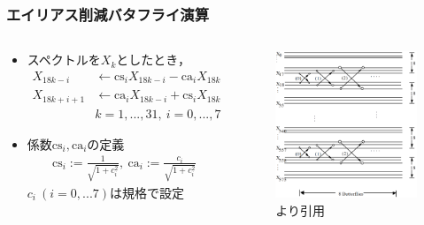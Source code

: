\documentclass[14pt,xcolor=dvipsnames,table,dvipdfmx]{beamer}
\begin{document}
\begin{frame}[c]
    \frametitle{エイリアス削減バタフライ演算}
    \begin{columns}
        \begin{column}{0.55\textwidth}
            \small
            \begin{itemize}
                \item スペクトルを$X_{k}$としたとき，
                    \begin{align}
                        X_{18k - i} &\leftarrow \mathrm{cs}_{i} X_{18k - i} - \mathrm{ca}_{i} X_{18k + i + 1} \\
                        X_{18k + i + 1} &\leftarrow \mathrm{ca}_{i} X_{18k - i} + \mathrm{cs}_{i} X_{18k + i + 1} \\
                        & k = 1,...,31,\ i = 0,...,7 \nonumber
                    \end{align}
                \item 係数$\mathrm{cs}_{i},\mathrm{ca}_{i}$の定義
                    \begin{align}
                        \mathrm{cs}_{i} := \frac{1}{\sqrt{1 + c_{i}^{2}}},\ \mathrm{ca}_{i} := \frac{c_{i}}{\sqrt{1 + c_{i}^{2}}}
                    \end{align}
                    $c_{i}\ (i=0,...7)$は規格で設定
            \end{itemize}
        \end{column}
        \begin{column}{0.45\textwidth}
            \begin{figure}
                \includegraphics[width=52mm]{./figs/butterfly_reduction_alias.png}
                \caption*{\cite{raissi2002theory}より引用}
            \end{figure}
        \end{column}
        \end{columns}
\end{frame}
\end{document}
